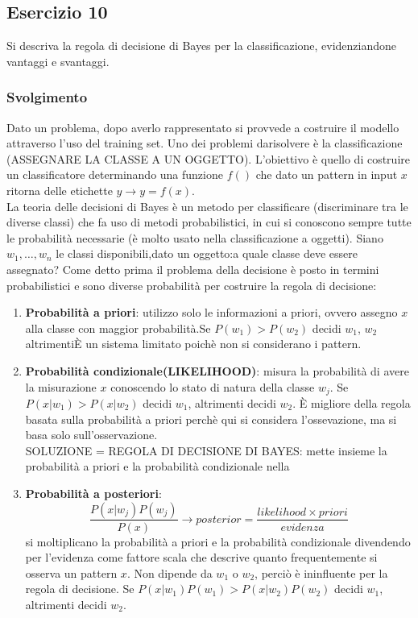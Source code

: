 \documentclass{article}
\begin{document}
\subsection*{Esercizio 10}
Si descriva la regola di decisione di Bayes per la classificazione, evidenziandone vantaggi e
svantaggi.
\subsubsection*{Svolgimento}
Dato un problema, dopo averlo rappresentato si provvede a costruire il modello attraverso l'uso del training set. Uno dei problemi darisolvere è la classificazione (ASSEGNARE LA CLASSE A UN OGGETTO). L'obiettivo è quello di costruire un classificatore determinando una funzione $f()$ che dato un pattern in input $x$ ritorna delle etichette $y \rightarrow y =f(x)$.\\
La teoria delle decisioni di Bayes è un metodo per classificare (discriminare tra le diverse classi) che fa uso di metodi probabilistici, in cui si conoscono sempre tutte le probabilità necessarie (è molto usato nella classificazione a oggetti).
Siano $w_1, \dots, w_n$ le classi disponibili,dato un oggetto:a quale classe deve essere assegnato? Come detto prima il problema della decisione è posto in termini probabilistici e sono diverse probabilità per costruire la regola di decisione:
\begin{enumerate}
    \item \textbf{Probabilità a priori}: utilizzo solo le informazioni a priori, ovvero assegno $x$ alla classe con maggior probabilità.Se $P(w_1)> P(w_2)$ decidi $w_1$, $w_2$ altrimentiÈ un sistema limitato poichè non si considerano i pattern.
    \item \textbf{Probabilità condizionale(LIKELIHOOD)}: misura la probabilità di avere la misurazione $x$ conoscendo lo stato di natura della classe $w_j$. Se $P(x|w_1) > P(x|w_2)$ decidi $w_1$, altrimenti decidi $w_2$. È migliore della regola basata sulla probabilità a priori perchè qui si considera l'ossevazione, ma si basa solo sull'osservazione.\\ SOLUZIONE = REGOLA DI DECISIONE DI BAYES: mette insieme la probabilità a priori e la probabilità condizionale nella 
    \item \textbf{Probabilità a posteriori}: $$ \frac{P(x | w_j)P(w_j)}{P(x)} \rightarrow posterior = \frac{likelihood \times priori}{evidenza}$$ 
    si moltiplicano la probabilità a priori e la probabilità condizionale divendendo per l'evidenza come fattore scala che descrive quanto frequentemente si osserva un pattern $x$. Non dipende da $w_1$ o $w_2$, perciò è ininfluente per la regola di decisione. Se $P(x|w_1)P(w_1)> P(x|w_2)P(w_2)$ decidi $w_1$, altrimenti decidi $w_2$. 
\end{enumerate}
\end{document}
